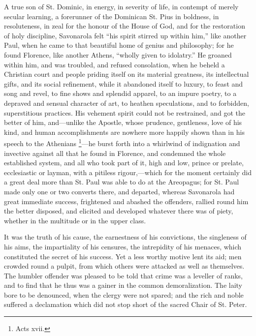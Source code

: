 A true son of St. Dominic, in energy, in severity of
life, in contempt of merely secular learning, a
forerunner of the Dominican St. Pius in boldness, in
resoluteness, in zeal for the honour of the House of God,
and for the restoration of holy discipline, Savonarola
felt ``his spirit stirred up within him,'' like
another Paul, when he came to that beautiful home of
genius and philosophy; for he found Florence, like
another Athens, ``wholly given to idolatry.'' He
groaned within him, and was troubled, and refused
consolation, when he beheld a Christian court and people
priding itself on its material greatness, its
intellectual gifts, and its social refinement, while it
abandoned itself to luxury, to feast and song and revel,
to fine shows and splendid apparel, to an impure poetry,
to a depraved and sensual character of art, to heathen
speculations, and to forbidden, superstitious practices.
His vehement spirit could not be restrained, and got the
better of him, and—unlike the Apostle, whose
prudence, gentleness, love of his kind, and human
accomplishments are nowhere more happily shown than in
his speech to the Athenians \footnote{Acts xvii.}—he burst
forth into a whirlwind of indignation and invective
against all that he found in Florence, and condemned the
whole established system, and all who took part of it,
high and low, prince or prelate, ecclesiastic or layman,
with a pitiless rigour,—which for the moment
certainly did a great deal more than St. Paul was able to
do at the Areopagus; for St. Paul made only one or two
converts there, and departed, whereas Savonarola had
great immediate success, frightened and abashed the
offenders, rallied round him the better disposed, and
elicited and developed whatever there was of piety,
whether in the multitude or in the upper class.

It was the truth of his cause, the earnestness of his
convictions, the singleness of his aims, the impartiality
of his censures, the intrepidity of his menaces, which
constituted the secret of his success. Yet a less worthy
motive lent its aid; men crowded round a pulpit, from
which others were attacked as well as themselves. The
humbler offender was pleased to be told that crime was a
leveller of ranks, and to find that he thus was a gainer
in the common demoralization. The laity bore to be
denounced, when the clergy were not spared; and the rich
and noble suffered a declamation which did not stop short
of the sacred Chair of St. Peter.

